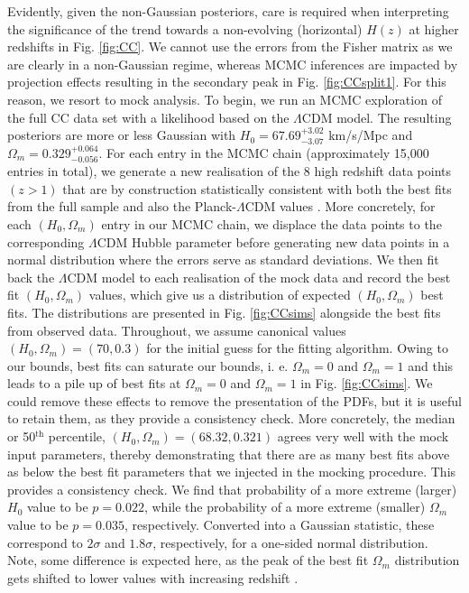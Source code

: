 \documentclass[aps,prl,10pt,twocolumn,superscriptaddress, nofootinbib]{revtex4}
\begin{document}
Evidently, given the non-Gaussian posteriors, care is required when interpreting the significance of the trend towards a non-evolving (horizontal) $H(z)$ at higher redshifts in Fig. \ref{fig:CC}. We cannot use the errors from the Fisher matrix as we are clearly in a non-Gaussian regime, whereas MCMC inferences are impacted by projection effects resulting in the secondary peak in Fig. \ref{fig:CCsplit1}. For this reason, we resort to mock analysis. To begin, we run an MCMC exploration of the full CC data set with a likelihood based on the $\Lambda$CDM model. The resulting posteriors are more or less Gaussian with $H_0 = 67.69^{+3.02}_{-3.07}$ km/s/Mpc and $\Omega_m = 0.329^{+0.064}_{-0.056}$. For each entry in the MCMC chain (approximately 15,000 entries in total), we generate a new realisation of the 8 high redshift data points $(z > 1)$ that are by construction statistically consistent with both the best fits from the full sample and also the Planck-$\Lambda$CDM values \cite{Planck:2018vyg}. More concretely, for each $(H_0, \Omega_m)$ entry in our MCMC chain, we displace the data points to the corresponding $\Lambda$CDM Hubble parameter before generating new data points in a normal distribution where the errors serve as standard deviations. We then fit back the $\Lambda$CDM model to each realisation of the mock data and record the best fit $(H_0, \Omega_m)$ values, which give us a distribution of expected $(H_0, \Omega_m)$ best fits. The distributions are presented in Fig. \ref{fig:CCsims} alongside the best fits from observed data. Throughout, we assume canonical values $(H_0, \Omega_m) = (70, 0.3)$ for the initial guess for the fitting algorithm. Owing to our bounds, best fits can saturate our bounds, i. e. $\Omega_m = 0$ and $\Omega_m = 1$ and this leads to a pile up of best fits at $\Omega_m = 0$ and $\Omega_m = 1$ in Fig. \ref{fig:CCsims}. We could remove these effects to remove the presentation of the PDFs, but it is useful to retain them, as they provide a consistency check. More concretely, the median or 50$^{\textrm{th}}$ percentile, $(H_0, \Omega_m) = (68.32, 0.321)$ agrees very well with the mock input parameters, thereby demonstrating that there are as many best fits above as below the best fit parameters that we injected in the mocking procedure. This provides a consistency check. We find that probability of a more extreme (larger) $H_0$ value to be $p = 0.022$, while the probability of a more extreme (smaller) $\Omega_m$ value to be $p = 0.035$, respectively. Converted into a Gaussian statistic, these correspond to $2 \sigma$ and $1.8 \sigma$, respectively, for a one-sided normal distribution. Note, some difference is expected here, as the peak of the best fit $\Omega_m$ distribution gets shifted to lower values with increasing redshift \cite{Colgain:2022tql}. 
\end{document}
